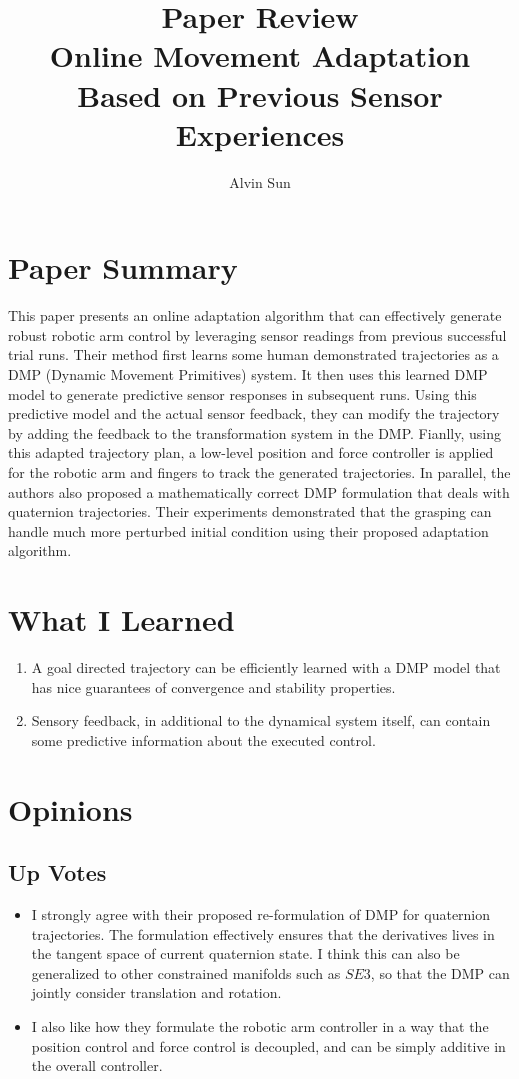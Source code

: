 \documentclass[10pt, twocolumn]{article}
\title{\vspace{-2.0em}Paper Review\\Online Movement Adaptation Based on Previous Sensor Experiences}
\author{Alvin Sun}
\begin{document}
\maketitle

\section{Paper Summary}
This paper presents an online adaptation algorithm that can effectively generate robust
robotic arm control by leveraging sensor readings from previous
successful trial runs. Their method first learns some human demonstrated trajectories
as a DMP (Dynamic Movement Primitives) system. It then uses this learned DMP model
to generate predictive sensor responses in subsequent runs. Using this predictive
model and the actual sensor feedback, they can modify the trajectory by adding
the feedback to the transformation system in the DMP. Fianlly, using this
adapted trajectory plan, a low-level position and force controller is applied
for the robotic arm and fingers to track the generated trajectories. In parallel,
the authors also proposed a mathematically correct DMP formulation that deals
with quaternion trajectories. Their experiments demonstrated that the grasping
can handle much more perturbed initial condition using their proposed adaptation
algorithm.

\section{What I Learned}
\begin{enumerate}
  \item A goal directed trajectory can be efficiently learned with a DMP model that has
    nice guarantees of convergence and stability properties.
  \item Sensory feedback, in additional to the dynamical system itself, can contain
    some predictive information about the executed control.
\end{enumerate}

\section{Opinions}

\subsection{Up Votes}
\begin{itemize}
  \item I strongly agree with their proposed re-formulation of DMP for
    quaternion trajectories. The formulation effectively ensures that the
    derivatives lives in the tangent space of current quaternion state.
    I think this can also be generalized to other constrained manifolds
    such as $SE3$, so that the DMP can jointly consider translation and
    rotation.

  \item I also like how they formulate the robotic arm controller in a way
    that the position control and force control is decoupled, and can be
    simply additive in the overall controller.
\end{itemize}
\end{document}
